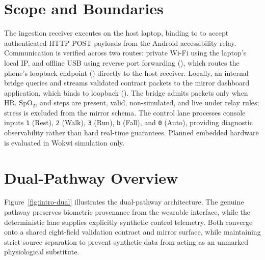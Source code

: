\section{Scope and Boundaries}
The ingestion receiver executes on the host laptop, binding to  to accept authenticated HTTP POST payloads from the Android accessibility relay. Communication is verified across two routes: private Wi-Fi using the laptop's local IP, and offline USB using reverse port forwarding (), which routes the phone's loopback endpoint () directly to the host receiver. Locally, an internal bridge queries  and streams validated contract packets to the mirror dashboard application, which binds to loopback (). The bridge admits packets only when HR, $\mathrm{SpO_2}$, and steps are present, valid, non-simulated, and live under relay rules; stress is excluded from the mirror schema. The control lane processes console inputs \texttt{1} (Rest), \texttt{2} (Walk), \texttt{3} (Run), \texttt{b} (Fall), and \texttt{0} (Auto), providing diagnostic observability rather than hard real-time guarantees. Planned embedded hardware is evaluated in Wokwi simulation only.

\section{Dual-Pathway Overview}
Figure~\ref{fig:intro-dual} illustrates the dual-pathway architecture. The genuine pathway preserves biometric provenance from the wearable interface, while the deterministic lane supplies explicitly synthetic control telemetry. Both converge onto a shared eight-field validation contract and mirror surface, while maintaining strict source separation to prevent synthetic data from acting as an unmarked physiological substitute.

